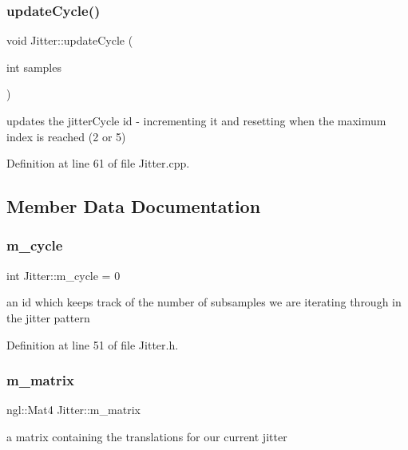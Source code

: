 \subsubsection{updateCycle()}
{\footnotesize\ttfamily void Jitter\+::update\+Cycle (\begin{DoxyParamCaption}\item[{int}]{samples }\end{DoxyParamCaption})\hspace{0.3cm}{\ttfamily [private]}}



updates the jitter\+Cycle id -\/ incrementing it and resetting when the maximum index is reached (2 or 5) 



Definition at line 61 of file Jitter.\+cpp.



\subsection{Member Data Documentation}
\mbox{\label{class_jitter_a01fec565d381d9aacea27dae75fa226d}} 
\subsubsection{m\_cycle}
{\footnotesize\ttfamily int Jitter\+::m\+\_\+cycle = 0\hspace{0.3cm}{\ttfamily [private]}}



an id which keeps track of the number of subsamples we are iterating through in the jitter pattern 



Definition at line 51 of file Jitter.\+h.

\mbox{\label{class_jitter_a67d037e5eef7f41caeaca6cb4fece173}} 
\subsubsection{m\_matrix}
{\footnotesize\ttfamily ngl\+::\+Mat4 Jitter\+::m\+\_\+matrix\hspace{0.3cm}{\ttfamily [private]}}



a matrix containing the translations for our current jitter 




